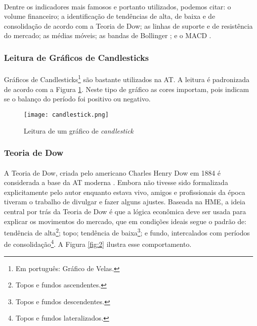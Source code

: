 \paragraph{} Dentre os indicadores mais famosos e portanto utilizados, podemos citar: o volume financeiro; a identificação de tendências de alta, de baixa e de consolidação de acordo com a Teoria de Dow; as linhas de suporte e de resistência do mercado; as médias móveis; as bandas de Bollinger \cite{bollinger2002bollinger}; e o MACD \cite{appel2007understanding}.


\FloatBarrier
\subsubsection*{Leitura de Gráficos de Candlesticks}

\paragraph{} Gráficos de Candlesticks\footnote{Em português: Gráfico de Velas.} são bastante utilizados na AT. A leitura é padronizada de acordo com a Figura \ref{fig:1}. Neste tipo de gráfico as cores importam, pois indicam se o balanço do período foi positivo ou negativo.

\begin{figure}[h]
    \texttt{[image: candlestick.png]}
    \centering
    \caption{Leitura de um gráfico de \textit{candlestick} \cite{candlestick}}
    \label{fig:1}
\end{figure}


\FloatBarrier
\subsubsection*{Teoria de Dow}

\paragraph{} A Teoria de Dow, criada pelo americano Charles Henry Dow em 1884 é considerada a base da AT moderna \cite{kirkpatrick2010technical}. Embora não tivesse sido formalizada explicitamente pelo autor enquanto estava vivo, amigos e profissionais da época tiveram o trabalho de divulgar e fazer alguns ajustes. Baseada na HME, a ideia central por trás da Teoria de Dow é que a lógica econômica deve ser usada para explicar os movimentos do mercado, que em condições ideais segue o padrão de: tendência de alta\footnote{Topos e fundos ascendentes.}; topo; tendência de baixa\footnote{Topos e fundos descendentes.}; e fundo, intercalados com períodos de consolidação\footnote{Topos e fundos lateralizados.}. A Figura \ref{fig:2} ilustra esse comportamento.

